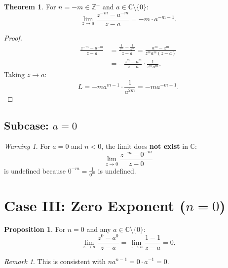 \documentclass{article}
\theoremstyle{definition}
\newtheorem{theorem}{Theorem}[section]
\newtheorem{proposition}{Proposition}[section]
\theoremstyle{remark}
\newtheorem{remark}{Remark}[section]
\newtheorem{warning}{Warning}[section]
\newcommand{\C}{\mathbb{C}}
\newcommand{\Z}{\mathbb{Z}}
\begin{document}
\begin{theorem}
For $n = -m \in \Z^-$ and $a \in \C \setminus \{0\}$:
\begin{equation}
\lim_{z \to a} \frac{z^{-m} - a^{-m}}{z - a} = -m \cdot a^{-m-1}.
\end{equation}
\end{theorem}

\begin{proof}
\begin{align}
\frac{z^{-m} - a^{-m}}{z - a} &= \frac{\frac{1}{z^m} - \frac{1}{a^m}}{z - a} = \frac{a^m - z^m}{z^m a^m (z - a)} \\
&= -\frac{z^m - a^m}{z - a} \cdot \frac{1}{z^m a^m}.
\end{align}
Taking $z \to a$:
\begin{equation}
L = -m a^{m-1} \cdot \frac{1}{a^{2m}} = -m a^{-m-1}.
\end{equation}
\end{proof}

\subsection{Subcase: $a = 0$}

\begin{warning}
For $a = 0$ and $n < 0$, the limit does \textbf{not exist} in $\C$:
\begin{equation}
\lim_{z \to 0} \frac{z^{-m} - 0^{-m}}{z - 0}
\end{equation}
is undefined because $0^{-m} = \frac{1}{0^m}$ is undefined.
\end{warning}

\section{Case III: Zero Exponent ($n = 0$)}

\begin{proposition}
For $n = 0$ and any $a \in \C \setminus \{0\}$:
\begin{equation}
\lim_{z \to a} \frac{z^0 - a^0}{z - a} = \lim_{z \to a} \frac{1 - 1}{z - a} = 0.
\end{equation}
\end{proposition}

\begin{remark}
This is consistent with $n a^{n-1} = 0 \cdot a^{-1} = 0$.
\end{remark}
\end{document}
